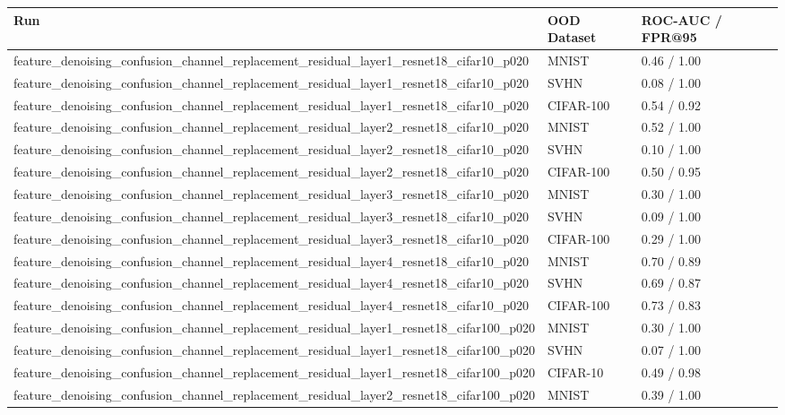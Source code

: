 \begin{tabular}{lll}
\toprule
Run & OOD Dataset & ROC-AUC / FPR@95 \\
\midrule
feature\_denoising\_confusion\_channel\_replacement\_residual\_layer1\_resnet18\_cifar10\_p020 & MNIST & 0.46 / 1.00 \\
feature\_denoising\_confusion\_channel\_replacement\_residual\_layer1\_resnet18\_cifar10\_p020 & SVHN & 0.08 / 1.00 \\
feature\_denoising\_confusion\_channel\_replacement\_residual\_layer1\_resnet18\_cifar10\_p020 & CIFAR-100 & 0.54 / 0.92 \\
feature\_denoising\_confusion\_channel\_replacement\_residual\_layer2\_resnet18\_cifar10\_p020 & MNIST & 0.52 / 1.00 \\
feature\_denoising\_confusion\_channel\_replacement\_residual\_layer2\_resnet18\_cifar10\_p020 & SVHN & 0.10 / 1.00 \\
feature\_denoising\_confusion\_channel\_replacement\_residual\_layer2\_resnet18\_cifar10\_p020 & CIFAR-100 & 0.50 / 0.95 \\
feature\_denoising\_confusion\_channel\_replacement\_residual\_layer3\_resnet18\_cifar10\_p020 & MNIST & 0.30 / 1.00 \\
feature\_denoising\_confusion\_channel\_replacement\_residual\_layer3\_resnet18\_cifar10\_p020 & SVHN & 0.09 / 1.00 \\
feature\_denoising\_confusion\_channel\_replacement\_residual\_layer3\_resnet18\_cifar10\_p020 & CIFAR-100 & 0.29 / 1.00 \\
feature\_denoising\_confusion\_channel\_replacement\_residual\_layer4\_resnet18\_cifar10\_p020 & MNIST & 0.70 / 0.89 \\
feature\_denoising\_confusion\_channel\_replacement\_residual\_layer4\_resnet18\_cifar10\_p020 & SVHN & 0.69 / 0.87 \\
feature\_denoising\_confusion\_channel\_replacement\_residual\_layer4\_resnet18\_cifar10\_p020 & CIFAR-100 & 0.73 / 0.83 \\
feature\_denoising\_confusion\_channel\_replacement\_residual\_layer1\_resnet18\_cifar100\_p020 & MNIST & 0.30 / 1.00 \\
feature\_denoising\_confusion\_channel\_replacement\_residual\_layer1\_resnet18\_cifar100\_p020 & SVHN & 0.07 / 1.00 \\
feature\_denoising\_confusion\_channel\_replacement\_residual\_layer1\_resnet18\_cifar100\_p020 & CIFAR-10 & 0.49 / 0.98 \\
feature\_denoising\_confusion\_channel\_replacement\_residual\_layer2\_resnet18\_cifar100\_p020 & MNIST & 0.39 / 1.00 \\

\end{tabular}
